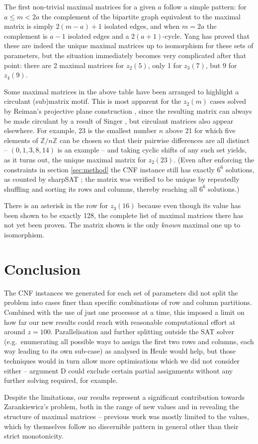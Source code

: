 \documentclass[10pt,a4paper]{article}
\theoremstyle{definition}
\begin{document}
	The first non-trivial maximal matrices for a given $a$ follow a simple pattern: for $a\le m<2a$ the complement of the bipartite graph equivalent to the maximal matrix is simply $2(m-a)+1$ isolated edges, and when $m=2a$ the complement is $a-1$ isolated edges and a $2(a+1)$-cycle. Yang \cite{yang} has proved that these are indeed the unique maximal matrices up to isomorphism for these sets of parameters, but the situation immediately becomes very complicated after that point: there are 2 maximal matrices for $z_2(5)$, only 1 for $z_3(7)$, but 9 for $z_4(9)$.
	
	Some maximal matrices in the above table have been arranged to highlight a circulant (sub)matrix motif. This is most apparent for the $z_2(m)$ cases solved by Reiman's projective plane construction \cite{reiman}, since the resulting matrix can always be made circulant by a result of Singer \cite{singer}, but circulant matrices also appear elsewhere. For example, 23 is the smallest number $n$ above 21 for which five elements of $\mathbb Z/n\mathbb Z$ can be chosen so that their pairwise differences are all distinct -- $(0,1,3,8,14)$ is an example -- and taking cyclic shifts of any such set yields, as it turns out, the unique maximal matrix for $z_2(23)$. (Even after enforcing the constraints in section \ref{sec:method} the CNF instance still has exactly $6^6$ solutions, as counted by sharpSAT \cite{sharpSAT}; the matrix was verified to be unique by repeatedly shuffling and sorting its rows and columns, thereby reaching all $6^6$ solutions.)
	
	There is an asterisk in the row for $z_3(16)$ because even though its value has been shown to be exactly 128, the complete list of maximal matrices there has not yet been proven. The matrix shown is the only \textit{known} maximal one up to isomorphism.
	
	\section{Conclusion}
	
	The CNF instances we generated for each set of parameters did not split the problem into cases finer than specific combinations of row and column partitions. Combined with the use of just one processor at a time, this imposed a limit on how far our new results could reach with reasonable computational effort at around $z=100$. Parallelisation and further splitting outside the SAT solver (e.g.\ enumerating all possible ways to assign the first two rows and columns, each way leading to its own sub-case) as analysed in Heule \cite{schur5} would help, but those techniques would in turn allow more optimisations which we did not consider either -- argument D could exclude certain partial assignments without any further solving required, for example.
	
	Despite the limitations, our results represent a significant contribution towards Zarankiewicz's problem, both in the range of new values and in revealing the structure of maximal matrices -- previous work was mostly limited to the values, which by themselves follow no discernible pattern in general other than their strict monotonicity.
	
	\printbibliography
\end{document}
